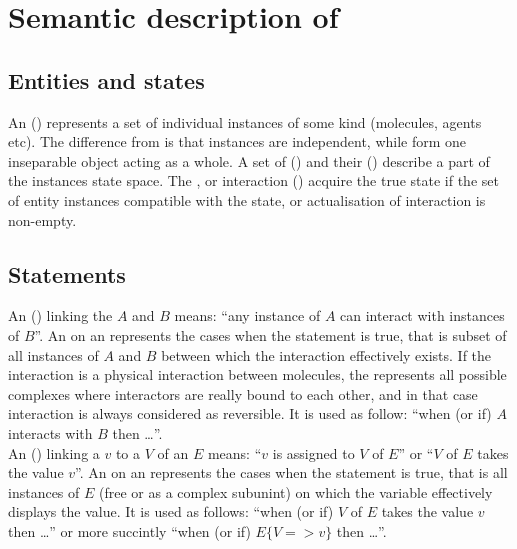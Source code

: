\section{Semantic description of \ERs}


\subsection{Entities and states}

An  () represents a set of individual instances of some kind (molecules, agents etc). The difference from \SBGNPDLone {} is that  instances are independent, while  form one inseparable object acting as a whole. A set of  () and their  () describe a part of the  instances state space. The  , or  interaction  () acquire the true state if the set of entity instances compatible with the  state, or  actualisation of interaction is non-empty. 

 
\subsection{Statements}

An  () linking the  $A$ and $B$ means: ``any instance of $A$ can interact with instances of $B$''. An  on an  represents the cases when the statement is true, that is subset of all instances of $A$ and $B$ between which the interaction effectively exists. If the interaction is a physical interaction between molecules, the  represents all possible complexes where interactors are really bound to each other, and in that case interaction is always considered as reversible. It is used as follow: ``when (or if) $A$ interacts with $B$ then \ldots''.\\[\baselineskip]

\noindent
An  () linking a  $v$ to a  $V$ of an  $E$ means: ``$v$ is assigned to $V$ of $E$'' or ``$V$ of $E$ takes the value $v$''. An  on an  represents the cases when the statement is true, that is all instances of $E$ (free or as a complex subunint) on which the variable effectively displays the value. It is used as follows: ``when (or if) $V$ of $E$ takes the value $v$ then \ldots'' or more succintly ``when (or if) $E\{V => v\}$ then \ldots''.\\[\baselineskip]

